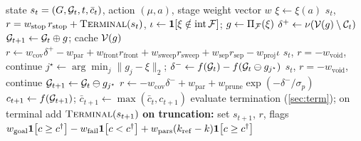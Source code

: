 \documentclass[11pt,a4paper]{article}
\begin{document}
\begin{algorithm}[h]
\small
\caption{One environment step of $\Mdp$}
\begin{algorithmic}[1]
\Require state $s_t = (G, \mathcal{G}_t, t, \bar c_t)$, action $(\mu, a)$, stage weight vector $w$
\State $\xi \gets \xi(a)$ 
\If{$\mu = \STOP$}
  \State \Return $s_t$, $r = w_{\mathrm{stop}}\,r_{\mathrm{stop}} + \textsc{Terminal}(s_t)$, 
\ElsIf{$\mu = \ADD$}
  \State $\iota \gets \mathbf{1}\!\left[\xi \notin \operatorname{int}\mathcal{F}\right]$; \; $g \gets \Pi_{\mathcal{F}}(\xi)$
  \State $\delta^{+} \gets \nu(\mathcal{V}(g) \setminus \mathcal{C}_t)$ 
  \State $\mathcal{G}_{t+1} \gets \mathcal{G}_t \oplus g$; \; cache $\mathcal{V}(g)$
  \State $r \gets w_{\mathrm{cov}}\delta^{+} - w_{\mathrm{par}} + w_{\mathrm{front}} r_{\mathrm{front}} + w_{\mathrm{sweep}} r_{\mathrm{sweep}} + w_{\mathrm{sep}} r_{\mathrm{sep}} - w_{\mathrm{proj}}\iota$
\Else \Comment{$\mu = \DEL$}
   \State \Return $s_t$, $r = -w_{\mathrm{void}}$, continue \EndIf
  \State $j^\star \gets \arg\min_j \lVert g_j - \xi\rVert_2$; \; $\delta^{-} \gets f(\mathcal{G}_t) - f(\mathcal{G}_t \ominus g_{j^\star})$
     \State \Return $s_t$, $r = -w_{\mathrm{void}}$, continue 
  \EndIf
  \State $\mathcal{G}_{t+1} \gets \mathcal{G}_t \ominus g_{j^\star}$
  \State $r \gets -w_{\mathrm{cov}}\delta^{-} + w_{\mathrm{par}} + w_{\mathrm{prune}}\exp(-\delta^{-}/\sigma_p)$
\EndIf
\State $c_{t+1} \gets f(\mathcal{G}_{t+1})$; \; $\bar c_{t+1} \gets \max(\bar c_t, c_{t+1})$
\State evaluate termination (\cref{sec:term}); on terminal add $\textsc{Terminal}(s_{t+1})$
\State \textbf{on truncation:} set  
\State \Return $s_{t+1}$, $r$, flags
\Statex
{}
  \State \Return $w_{\mathrm{goal}}\mathbf{1}\!\left[c \ge c^{\dagger}\right] - w_{\mathrm{fail}}\mathbf{1}\!\left[c < c^{\dagger}\right] + w_{\mathrm{pars}}(k_{\mathrm{ref}} - k)\mathbf{1}\!\left[c \ge c^{\dagger}\right]$
\EndFunction
\end{algorithmic}
\end{algorithm}
\end{document}
